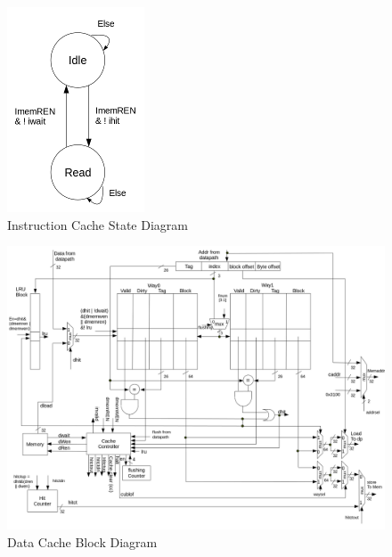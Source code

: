 \documentclass[12pt]{article}
\begin{document}
  \begin{figure}[hbp!]
    \begin{center}
      \includegraphics{diagrams/icache_state_machine.png}
    \end{center}

    \caption{Instruction Cache State Diagram}
		\label{fig:icache_sd}
  \end{figure}

  \newpage
  \begin{figure}[hbp!]
    \begin{center}
      \includegraphics[width=\textwidth]{diagrams/diagram_dcache.png}
    \end{center}

    \caption{Data Cache Block Diagram}
		\label{fig:dcache}
  \end{figure}
\end{document}
